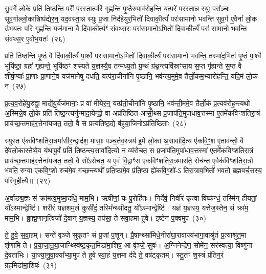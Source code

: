 सु॒व॒र्गे लो॒के प्रति॑ तिष्ठन्ति॒ परैः᳚ प॒रस्ता॒त्परि॑ गृह्णन्ति पृ॒ष्ठैरु॒पाव॑रोहन्ति॒ यत्परे॑ प॒रस्ता॒न्न स्युः परा᳚ञ्चः सुव॒र्गाल्लो॒कान्निष्प॑द्येर॒न्॒ यद॒वस्ता॒न्न स्युः प्र॒जा निर्द॑हेयुर॒भितो॑ दिवाकी॒र्त्यं॑ परः॑सामानो भवन्ति सुव॒र्ग ए॒वैनां᳚ लो॒क उ॑भ॒यतः॒ परि॑ गृह्णन्ति॒ यज॑माना॒ वै दि॑वाकी॒र्त्यꣳ॑ संवथ्स॒रः परः॑सामानो॒\-ऽभितो॑ दिवाकी॒र्त्यं॑ परः॑ सामानो भवन्ति संवथ्स॒र ए॒वोभ॒यतः॑~(२६)

प्रति॑ तिष्ठन्ति पृ॒ष्ठं वै दि॑वाकी॒र्त्यं॑ पा॒र्श्वे परः॑सामानो॒\-ऽभितो॑ दिवाकी॒र्त्यं॑ परः॑सामानो भवन्ति॒ तस्मा॑द॒भितः॑ पृ॒ष्ठं पा॒र्श्वे भूयि॑ष्ठा॒ ग्रहा॑ गृह्यन्ते॒ भूयि॑ष्ठꣳ शस्यते य॒ज्ञस्यै॒व तन्म॑ध्य॒तो ग्र॒न्थं ग्र॑थ्न॒न्त्यवि॑स्रꣳसाय स॒प्त गृ॑ह्यन्ते स॒प्त वै शी॑र्\mbox{}ष॒ण्याः᳚ प्रा॒णाः प्रा॒णाने॒व यज॑मानेषु दधति॒ यत्प॑रा॒चीना॑नि पृ॒ष्ठानि॒ भव॑न्त्य॒मुमे॒व तैर्लो॒कम॒भ्यारो॑हन्ति॒ यदि॒मं लो॒कं न~(२७)

प्र॒त्य॒व॒रोहे॑यु॒रुद्वा॒ माद्ये॑यु॒र्यज॑मानाः॒ प्र वा॑ मीयेर॒न्॒ यत्प्र॑ती॒चीना॑नि पृ॒ष्ठानि॒ भव॑न्ती॒ममे॒व तैर्लो॒कं प्र॒त्यव॑रोह॒न्त्यथो॑ अ॒स्मिन्ने॒व लो॒के प्रति॑ तिष्ठ॒न्त्यनु॑न्मादा॒येन्द्रो॒ वा अप्र॑तिष्ठित आसी॒थ्स प्र॒जा\-प॑ति॒मुपा॑धाव॒त्तस्मा॑ ए॒तमे॑कविꣳशतिरा॒त्रं प्राय॑च्छ॒त्तमाह॑र॒त्तेना॑यजत॒ ततो॒ वै स प्रत्य॑तिष्ठ॒द्ये ब॑हुया॒जिनो\-ऽप्र॑तिष्ठिताः~(२८)

स्युस्त ए॑कविꣳशतिरा॒त्रमा॑सीर॒न्द्वाद॑श॒ मासाः॒ पञ्च॒र्तव॒स्त्रय॑ इ॒मे लो॒का अ॒सावा॑दि॒त्य ए॑कवि॒ꣳ॒श ए॒ताव॑न्तो॒ वै दे॑वलो॒कास्तेष्वे॒व य॑थापू॒र्वं प्रति॑ तिष्ठन्त्य॒सावा॑दि॒त्यो न व्य॑रोचत॒ स प्र॒जा\-प॑ति॒मुपा॑धाव॒त्तस्मा॑ ए॒तमे॑कविꣳशति\-रा॒त्रं प्राय॑च्छ॒त्तमाह॑र॒त्तेना॑यजत॒ ततो॒ वै सो॑\-ऽरोचत॒ य ए॒वं वि॒द्वाꣳ॑स एकविꣳशतिरा॒त्रमास॑ते॒ रोच॑न्त ए॒वैक॑विꣳशतिरा॒त्रो भ॑वति॒ रुग्वा ए॑कवि॒ꣳ॒शो रुच॑मे॒व ग॑च्छ॒न्त्यथो᳚ प्रति॒ष्ठामे॒व प्र॑ति॒ष्ठा ह्ये॑कवि॒ꣳ॒शो॑-\-ऽ तिरा॒त्राव॒भितो॑ भवतो ब्रह्मवर्च॒सस्य॒ परि॑गृहीत्यै॥~(२९)

{\anuvakamend[{गृ॒ह्ण॒न्ति॒ दि॒वा॒की॒र्त्ये॑नै॒वोभ॒यतो॒ नाप्र॑तिष्ठिता॒ आस॑त॒ एक॑विꣳशतिश्च}]}%

अ॒र्वाङ्य॒ज्ञः सं क्रा॑मत्व॒मुष्मा॒दधि॒ माम॒भि। ऋषी॑णां॒ यः पु॒रोहि॑तः। निर्दे॑वं॒ निर्वी॑रं कृ॒त्वा विष्क॑न्धं॒ तस्मि॑न् हीयतां॒ यो᳚\-ऽस्मान्द्वेष्टि॑। शरी॑रं यज्ञशम॒लं कुसी॑दं॒ तस्मि᳚न्थ्सीदतु॒ यो᳚\-ऽस्मान्द्वेष्टि॑। यज्ञ॑ य॒ज्ञस्य॒ यत्तेज॒स्तेन॒ सं क्रा॑म॒ माम॒भि। ब्रा॒ह्म॒णानृ॒त्विजो॑ दे॒वान् य॒ज्ञस्य॒ तप॑सा॒ ते सवा॒हमा हु॑वे। इ॒ष्टेन॑ प॒क्वमुप॑~(३०)

ते॒ हु॒वे॒ स॒वा॒हम्। सन्ते॑ वृञ्जे सुकृ॒तꣳ सं प्र॒जां प॒शून्। प्रै॒षान्थ्सा॑मिधे॒नीरा॑घा॒रावाज्य॑भागा॒वाश्रु॑तं प्र॒त्याश्रु॑त॒मा शृ॑णामि ते। प्र॒या॒जा॒नू॒या॒जान्थ्स्वि॑ष्ट॒कृत॒मिडा॑मा॒शिष॒ आ वृ॑ञ्जे॒ सुवः॑। अ॒ग्निनेन्द्रे॑ण॒ सोमे॑न॒ सर॑स्वत्या॒ विष्णु॑ना दे॒वता॑भिः। या॒ज्या॒नु॒वा॒क्या᳚भ्या॒मुप॑ ते हुवे स्वा॒हं य॒ज्ञमा द॑दे ते॒ वष॑ट्कृतम्। स्तु॒तꣳ श॒स्त्रं प्र॑तिग॒रं ग्रह॒मिडा॑मा॒शिषः॑~(३१)

